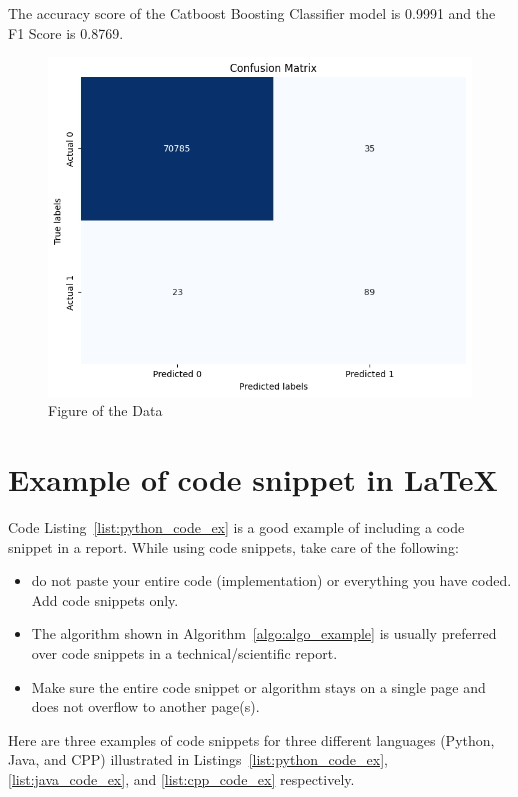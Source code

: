  The accuracy score of the Catboost Boosting Classifier model is 0.9991 and the F1 Score is 0.8769.  

\begin{figure}[ht]
    \centering
    \includegraphics[scale=0.6]{figures/CM_CatBoost.png}
    \caption{Figure of the Data}
    \label{fig:Plot of the Data}
\end{figure}

\clearpage


\section{Example of code snippet  in \LaTeX}

Code Listing~\ref{list:python_code_ex} is a good example of including a code snippet in a report. While using code snippets, take care of the following:
\begin{itemize}
    \item do not paste your entire code (implementation) or everything you have coded. Add code snippets only. 
    \item The algorithm shown in Algorithm~\ref{algo:algo_example} is usually preferred over code snippets in a technical/scientific report. 
    \item Make sure the entire code snippet or algorithm stays on a single page and does not overflow to another page(s).  
\end{itemize}

Here are three examples of code snippets for three different languages (Python, Java, and CPP) illustrated in Listings~\ref{list:python_code_ex}, \ref{list:java_code_ex}, and \ref{list:cpp_code_ex} respectively.  

